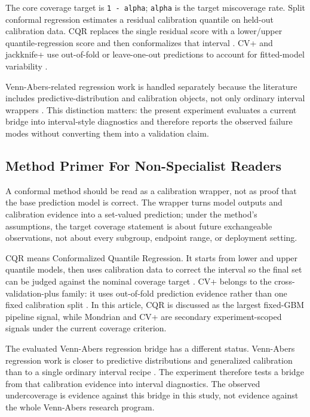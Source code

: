 \documentclass[11pt]{article}
\begin{document}
The core coverage target is \texttt{1 - alpha}; \texttt{alpha} is the target miscoverage rate. Split conformal regression estimates a residual calibration quantile on held-out calibration data. CQR replaces the single residual score with a lower/upper quantile-regression score and then conformalizes that interval \cite{romano2019conformalized_quantile_regression}. CV+ and jackknife+ use out-of-fold or leave-one-out predictions to account for fitted-model variability \cite{barber2020jackknife_plus,kim2020jackknife_after_bootstrap}.

Venn-Abers-related regression work is handled separately because the literature includes predictive-distribution and calibration objects, not only ordinary interval wrappers \cite{nouretdinov2018ivapd,nouretdinov2024ivapd_applications,vanderlaan2025generalized_venn_abers,petej2026inductive_venn_abers_regressors}. This distinction matters: the present experiment evaluates a current bridge into interval-style diagnostics and therefore reports the observed failure modes without converting them into a validation claim.

\subsection{Method Primer For Non-Specialist Readers}

A conformal method should be read as a calibration wrapper, not as proof that the base prediction model is correct. The wrapper turns model outputs and calibration evidence into a set-valued prediction; under the method's assumptions, the target coverage statement is about future exchangeable observations, not about every subgroup, endpoint range, or deployment setting.

CQR means Conformalized Quantile Regression. It starts from lower and upper quantile models, then uses calibration data to correct the interval so the final set can be judged against the nominal coverage target \cite{romano2019conformalized_quantile_regression}. CV+ belongs to the cross-validation-plus family: it uses out-of-fold prediction evidence rather than one fixed calibration split \cite{barber2020jackknife_plus,kim2020jackknife_after_bootstrap}. In this article, CQR is discussed as the largest fixed-GBM pipeline signal, while Mondrian and CV+ are secondary experiment-scoped signals under the current coverage criterion.

The evaluated Venn-Abers regression bridge has a different status. Venn-Abers regression work is closer to predictive distributions and generalized calibration than to a single ordinary interval recipe \cite{nouretdinov2018ivapd,nouretdinov2024ivapd_applications,vanderlaan2025generalized_venn_abers,petej2026inductive_venn_abers_regressors}. The experiment therefore tests a bridge from that calibration evidence into interval diagnostics. The observed undercoverage is evidence against this bridge in this study, not evidence against the whole Venn-Abers research program.
\end{document}
